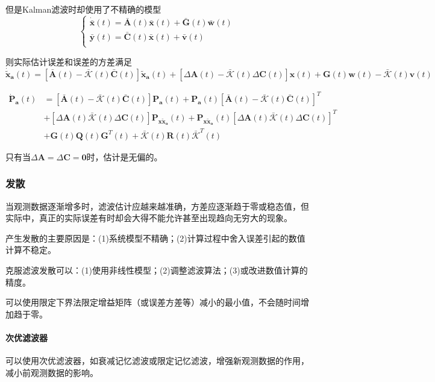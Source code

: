 \documentclass[11pt,a4paper]{ctexart}
\begin{document}
            但是Kalman滤波时却使用了不精确的模型
            \[\begin{cases}
            \bm{\dot{\bar x}}(t)=\bar{\bm A}(t)\bm{\bar x}(t)+\bar{\bm G}(t)\bm{\bar w}(t)\\
            \bm{\bar y}(t)=\bar{\bm C}(t)\bm{\bar x}(t)+\bm{\bar v}(t)\\
            \end{cases}\]

            则实际估计误差和误差的方差满足
            \[
            \bm{\dot{\tilde x}_a}(t)=[\bar{\bm A}(t)-\bar{\mathscr{K}}(t)\bar{\bm C}(t)]\bm{\tilde x_a}(t)+[\Delta\bm A(t)-\bar{\mathscr{K}}(t)\Delta\bm C(t)]\bm x(t)+\bm G(t)\bm w(t)-\bar{\mathscr{K}}(t)\bm v(t)
            \]

            \begin{align*}
            \bm{\dot P_a}(t)&=[\bar{\bm A}(t)-\bar{\mathscr{K}}(t)\bar{\bm C}(t)]\bm{P_a}(t)+\bm{P_a}(t)[\bar{\bm A}(t)-\bar{\mathscr{K}}(t)\bar{\bm C}(t)]^T\\
            &+[\Delta\bm A(t)\bar{\mathscr{K}}(t)\Delta\bm C(t)]\bm{P_{x\tilde x_a}}(t)+\bm{P_{x\tilde x_a}}(t)[\Delta\bm A(t)\bar{\mathscr{K}}(t)\Delta\bm C(t)]^T\\
            &+\bm G(t)\bm Q(t)\bm G^T(t)+\bar{\mathscr{K}}(t)\bm R(t)\bar{\mathscr{K}}^T(t)
            \end{align*}

            只有当$\Delta\bm A=\Delta\bm C=\bm 0$时，估计是无偏的。
        \subsubsection{发散}
            当观测数据逐渐增多时，滤波估计应越来越准确，方差应逐渐趋于零或稳态值，但实际中，真正的实际误差有时却会大得不能允许甚至出现趋向无穷大的现象。
            
            产生发散的主要原因是：(1)系统模型不精确；(2)计算过程中舍入误差引起的数值计算不稳定。

            克服滤波发散可以：(1)使用非线性模型；(2)调整滤波算法；(3)或改进数值计算的精度。
            
            可以使用限定下界法限定增益矩阵（或误差方差等）减小的最小值，不会随时间增加趋于零。

            \paragraph{次优滤波器}\leavevmode

            可以使用次优滤波器，如衰减记忆滤波或限定记忆滤波，增强新观测数据的作用，减小前观测数据的影响。
\end{document}
